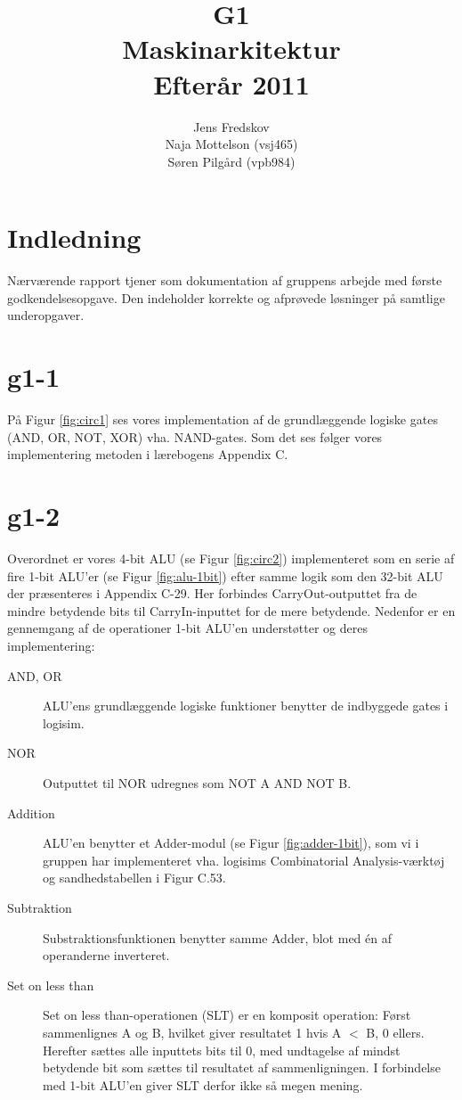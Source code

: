 \documentclass[10pt,a4paper,danish]{article}
\title{G1\\Maskinarkitektur\\Efterår 2011}
\author{Jens Fredskov\\ Naja Mottelson (vsj465)\\Søren Pilgård (vpb984)}
\begin{document}
\maketitle
\newpage

\tableofcontents
\newpage

\section{Indledning}
Nærværende rapport tjener som dokumentation af gruppens arbejde med første
godkendelsesopgave. Den indeholder korrekte og afprøvede løsninger på samtlige
underopgaver. 

\section{g1-1}
På Figur \ref{fig:circ1} ses vores implementation af de grundlæggende logiske
gates (AND, OR, NOT, XOR) vha. NAND-gates. Som det ses følger vores implementering
metoden i lærebogens Appendix C. 

\section{g1-2} 
Overordnet er vores 4-bit ALU (se Figur \ref{fig:circ2}) implementeret som en serie af fire 1-bit ALU'er
(se Figur \ref{fig:alu-1bit}) efter samme logik som den 32-bit ALU der præsenteres i Appendix C-29. Her 
forbindes CarryOut-outputtet fra de mindre betydende bits til CarryIn-inputtet for de mere betydende. 
Nedenfor er en gennemgang af de operationer 1-bit ALU'en understøtter og deres implementering: 

\begin{description}
\item[AND, OR] ALU'ens grundlæggende logiske funktioner benytter de indbyggede gates i logisim.
\item[NOR] Outputtet til NOR udregnes som NOT A AND NOT B. 
\item[Addition] ALU'en benytter et Adder-modul (se Figur \ref{fig:adder-1bit}), som vi i gruppen har 
             implementeret vha. logisims Combinatorial Analysis-værktøj og sandhedstabellen i Figur C.53. 
\item[Subtraktion] Substraktionsfunktionen benytter samme Adder, blot med én af operanderne inverteret. 
\item[Set on less than] Set on less than-operationen (SLT) er en komposit operation: Først sammenlignes A og B, 
                     hvilket giver resultatet 1 hvis A $<$ B, 0 ellers. Herefter sættes alle inputtets bits
                     til 0, med undtagelse af mindst betydende bit som sættes til resultatet af 
                     sammenligningen. I forbindelse med 1-bit ALU'en giver SLT derfor ikke så megen mening.
\end{description}
\end{document}

